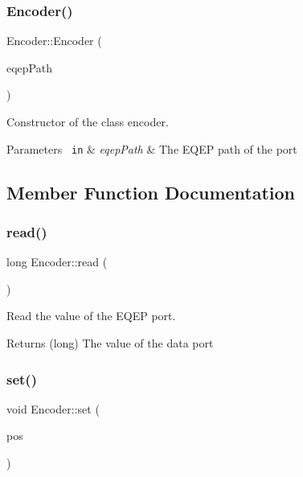 \subsubsection{\texorpdfstring{Encoder()}{Encoder()}}
{\footnotesize\ttfamily Encoder\+::\+Encoder (\begin{DoxyParamCaption}\item[{std\+::string}]{eqep\+Path }\end{DoxyParamCaption})}



Constructor of the class encoder. 


\begin{DoxyParams}[1]{Parameters}
\mbox{\texttt{ in}}  & {\em eqep\+Path} & The E\+Q\+EP path of the port \\
\hline
\end{DoxyParams}


\subsection{Member Function Documentation}
\mbox{\label{class_encoder_a6a2a38a6af043ab097f50036f5d0c9c6}} 
\subsubsection{\texorpdfstring{read()}{read()}}
{\footnotesize\ttfamily long Encoder\+::read (\begin{DoxyParamCaption}{ }\end{DoxyParamCaption})}



Read the value of the E\+Q\+EP port. 

\begin{DoxyReturn}{Returns}
(long) The value of the data port 
\end{DoxyReturn}
\mbox{\label{class_encoder_a52357dc803ed8c469228a5c71f2dbe20}} 
\subsubsection{\texorpdfstring{set()}{set()}}
{\footnotesize\ttfamily void Encoder\+::set (\begin{DoxyParamCaption}\item[{long}]{pos }\end{DoxyParamCaption})}



